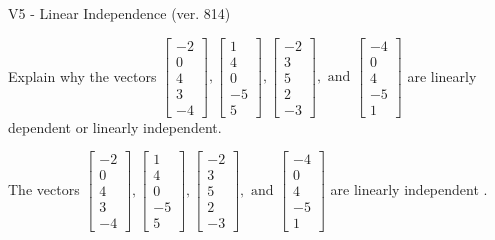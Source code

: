\begin{exercise}
  \begin{exerciseTitle}V5 - Linear Independence (ver. 814)\end{exerciseTitle}
  \begin{exerciseStatement}
    Explain why the vectors \(\left[\begin{array}{r}
-2 \\
0 \\
4 \\
3 \\
-4
\end{array}\right] , \left[\begin{array}{r}
1 \\
4 \\
0 \\
-5 \\
5
\end{array}\right] , \left[\begin{array}{r}
-2 \\
3 \\
5 \\
2 \\
-3
\end{array}\right] , \text{ and } \left[\begin{array}{r}
-4 \\
0 \\
4 \\
-5 \\
1
\end{array}\right]\) are linearly dependent or linearly independent.	


  \end{exerciseStatement}
  \begin{exerciseAnswer}
   The vectors \(\left[\begin{array}{r}
-2 \\
0 \\
4 \\
3 \\
-4
\end{array}\right] , \left[\begin{array}{r}
1 \\
4 \\
0 \\
-5 \\
5
\end{array}\right] , \left[\begin{array}{r}
-2 \\
3 \\
5 \\
2 \\
-3
\end{array}\right] , \text{ and } \left[\begin{array}{r}
-4 \\
0 \\
4 \\
-5 \\
1
\end{array}\right]\) are 
  	 linearly independent  .
  


  \end{exerciseAnswer}
\end{exercise}